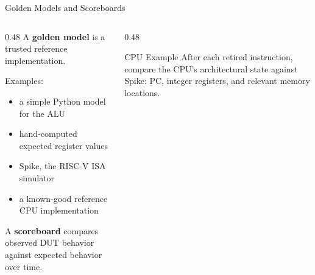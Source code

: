 \documentclass[aspectratio=169,10pt]{beamer}
\begin{document}
\begin{frame}{Golden Models and Scoreboards}
  \begin{columns}[T]
    \begin{column}{0.48\textwidth}
      A \textbf{golden model} is a trusted reference implementation.

      \vspace{0.6em}
      Examples:
      \begin{itemize}
        \item a simple Python model for the ALU
        \item hand-computed expected register values
        \item Spike, the RISC-V ISA simulator
        \item a known-good reference CPU implementation
      \end{itemize}

      \vspace{0.8em}
      A \textbf{scoreboard} compares observed DUT behavior against expected behavior over time.
    \end{column}
    \begin{column}{0.48\textwidth}
      \begin{center}
      \end{center}

      \vspace{0.6em}
      \begin{exampleblock}{CPU Example}
        After each retired instruction, compare the CPU's architectural state against Spike: PC, integer registers, and relevant memory locations.
      \end{exampleblock}
    \end{column}
  \end{columns}
\end{frame}
\end{document}
